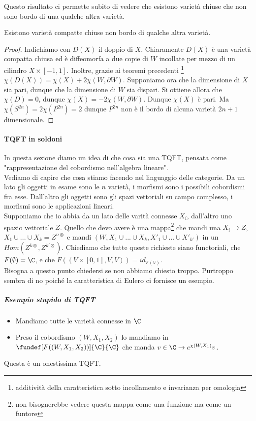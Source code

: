 Questo risultato ci permette subito di vedere che esistono varietà chiuse che non sono bordo di una qualche altra varietà.
\begin{teo}
Esistono varietà compatte chiuse non bordo di qualche altra varietà.%
\end{teo}
\begin{proof}
Indichiamo con $D(X)$ il doppio di $X$. Chiaramente $D(X)$ è una varietà compatta chiusa ed è diffeomorfa a due copie di $W$ incollate per mezzo di un cilindro $X\times [-1, 1]$. Inoltre, grazie ai teoremi precedenti \footnote{additività della caratteristica sotto incollamento e invarianza per omologia} $\chi(D(X))=\chi(X)+2\chi(W, \partial W)$. Supponiamo ora che la dimensione di $X$ sia pari, dunque che la dimensione di $W$ sia dispari. Si ottiene allora che $\chi(D)=0$, dunque $\chi(X)=-2\chi(W, \partial W)$. Dunque $\chi(X)$ è pari. Ma $\chi(S^{2n})=2\chi(P^{2n})=2$ dunque $P^{2n}$ non è il bordo di alcuna varietà $2n+1$ dimensionale. 
\end{proof}

\paragraph{TQFT in soldoni}
In questa sezione diamo un idea di che cosa sia una TQFT, pensata come "rappresentazione del cobordismo nell'algebra lineare".\\
Vediamo di capire che cosa stiamo facendo nel linguaggio delle categorie. Da un lato gli oggetti in esame sono le $n$ varietà, i morfismi sono i possibili cobordismi fra esse.
Dall'altro gli oggetti sono gli spazi vettoriali su campo complesso, i morfismi sono le applicazioni lineari.\\
Supponiamo che io abbia da un lato delle varità connesse $X_i$, dall'altro uno spazio vettoriale $Z$. Quello che devo avere è una mappa\footnote{non bisognerebbe vedere questa mappa come una funzione ma come un funtore} che mandi una $X_i\rightarrow Z$, $X_1\cup ... \cup X_k =Z^{n\otimes}$ e mandi $(W, X_1\cup ... \cup X_k, X'_1\cup ... \cup X'_{k'})$ in un $Hom(Z^{k\otimes}, Z^{k'\otimes})$.
Chiediamo che tutte queste richieste siano functoriali, che $F(\emptyset)=\C$, e che $F((V\times[0, 1], V, V))=id_{F(V)}$. \\
Bisogna a questo punto chiedersi se non abbiamo chiesto troppo. Purtroppo sembra di no poiché la caratteristica di Eulero ci fornisce un esempio.
\subparagraph{Esempio stupido di TQFT}
\begin{itemize}
\item Mandiamo tutte le varietà connesse in $\C$
\item Preso il cobordismo $(W, X_1, X_2)$ lo mandiamo in $\fundef[F((W, X_1, X_2))]{\C}{\C}$ che manda $v\in \C \rightarrow e^{\chi(W, X_1)}v$.
\end{itemize}
Questa è un onestissima TQFT.


